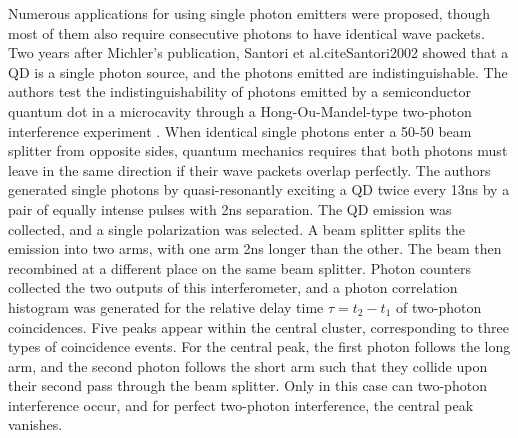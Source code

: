 Numerous applications for using single photon emitters were proposed, though most of them also require consecutive photons to have identical wave packets. Two years after Michler’s publication, Santori et al.cite{Santori2002} showed that a QD is a single photon source, and the photons emitted are indistinguishable. The authors test the indistinguishability of photons emitted by a semiconductor quantum dot in a microcavity through a Hong-Ou-Mandel-type two-photon interference experiment \cite{Fearn:89,DeGreve2012}. When identical single photons enter a 50-50 beam splitter from opposite sides, quantum mechanics requires that both photons must leave in the same direction if their wave packets overlap perfectly. The authors generated single photons by quasi-resonantly exciting a QD twice every 13ns by a pair of equally intense pulses with 2ns separation. The QD emission was collected, and a single polarization was selected. A beam splitter splits the emission into two arms, with one arm 2ns longer than the other. The beam then recombined at a different place on the same beam splitter. Photon counters collected the two outputs of this interferometer, and a photon correlation histogram was generated for the relative delay time $\tau = t_2 - t_1$ of two-photon coincidences. Five peaks appear within the central cluster, corresponding to three types of coincidence events. For the central peak, the first photon follows the long arm, and the second photon follows the short arm such that they collide upon their second pass through the beam splitter. Only in this case can two-photon interference occur, and for perfect two-photon interference, the central peak vanishes.
